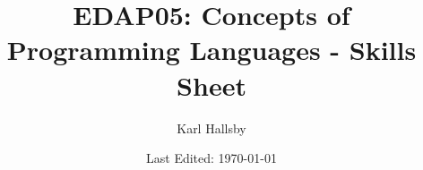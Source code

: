 


% 


\begin{titlepage}
  \title{EDAP05: Concepts of Programming Languages - Skills Sheet}
  \author{Karl Hallsby}
  \date{Last Edited: \today} %
\end{titlepage}


\maketitle
{} %
\tableofcontents
\clearpage
{} %















